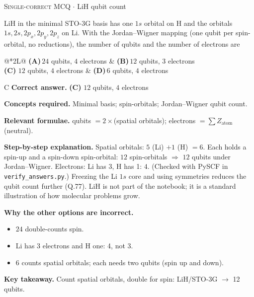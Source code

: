 \documentclass[11pt,a4paper]{article}
\newcommand{\optlabel}[1]{\textbf{(#1)}}
\newcommand{\correctlabel}[1]{\textcolor{okgreen}{\textbf{(#1)}\,\ding{51}}}
\newenvironment{qitem}[1]{\begin{list}{}{\setlength{\leftmargin}{3.3em}\setlength{\labelwidth}{3.1em}%
  \setlength{\labelsep}{0.2em}\setlength{\topsep}{3pt}\setlength{\parsep}{3pt}}\item[\textbf{Q.#1}\hfill]}{\end{list}}
\newcommand{\qsep}{\par\vspace{2pt}{\color{black!15}\hrule}\vspace{4pt}}
\newcommand{\qmeta}[2]{{\footnotesize\color{black!60}\textsc{#1} \;$\cdot$\; #2}\par}
\begin{document}
\begin{qitem}{10}
\qmeta{Single-correct MCQ}{LiH qubit count}
LiH in the minimal STO-3G basis has one $1s$ orbital on H and the orbitals $1s, 2s, 2p_x, 2p_y, 2p_z$ on Li. With the Jordan--Wigner
mapping (one qubit per spin-orbital, no reductions), the number of qubits and the number of electrons are
\par\smallskip\noindent\begin{tabularx}{\linewidth}{@{}*{2}{L}@{}}
\optlabel{A}\,$24$ qubits, $4$ electrons & \optlabel{B}\,$12$ qubits, $3$ electrons \\[3pt]
\correctlabel{C}\,$12$ qubits, $4$ electrons & \optlabel{D}\,$6$ qubits, $4$ electrons
\end{tabularx}
\end{qitem}
\begin{solbox}{C}
\textbf{\color{brand}Correct answer.} \textcolor{okgreen}{\textbf{(C)}} $12$ qubits, $4$ electrons

\textbf{\color{brand}Concepts required.} Minimal basis; spin-orbitals; Jordan--Wigner qubit count.

\textbf{\color{brand}Relevant formulae.} qubits $= 2\times$(spatial orbitals); electrons $=\sum Z_{\mathrm{atom}}$ (neutral).

\textbf{\color{brand}Step-by-step explanation.} Spatial orbitals: $5$ (Li) $+ 1$ (H) $= 6$. Each holds a spin-up and a spin-down spin-orbital: $12$ spin-orbitals $\Rightarrow$ $12$
qubits under Jordan--Wigner. Electrons: Li has 3, H has 1: $4$. (Checked with PySCF in \texttt{verify\_answers.py}.) Freezing the Li $1s$
core and using symmetries reduces the qubit count further (Q.77). LiH is not part of the notebook; it is a standard
illustration of how molecular problems grow.

\textbf{\color{brand}Why the other options are incorrect.}
\begin{itemize}[leftmargin=2.4em, itemsep=1pt, topsep=2pt]
\item[\textbf{(A)}] $24$ double-counts spin.
\item[\textbf{(B)}] Li has 3 electrons and H one: 4, not 3.
\item[\textbf{(D)}] $6$ counts spatial orbitals; each needs two qubits (spin up and down).
\end{itemize}
\textbf{\color{brand}Key takeaway.} Count spatial orbitals, double for spin: LiH/STO-3G $\to$ 12 qubits.
\end{solbox}
\qsep
\end{document}
